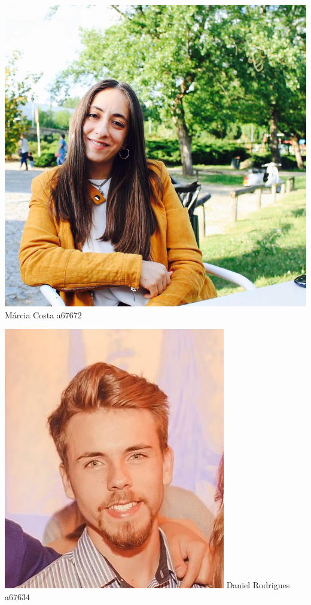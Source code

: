 \begin{titlepage}
\begin{center}
\begin{minipage}[b]{.1\textwidth}
	\includegraphics[scale=0.1002]{marcia}
	\small{Márcia Costa a67672}
\end{minipage}
\hfill
\begin{minipage}[b]{.1\textwidth}
	\includegraphics[scale=0.3]{daniel}
	\small{Daniel Rodrigues a67634}
\end{minipage}

\end{center}
\end{titlepage}
